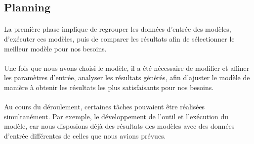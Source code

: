 \subsection{Planning}
\paragraph{}
\vspace{-2em}
La première phase implique de regrouper les données d'entrée des modèles, d'exécuter ces modèles, puis de comparer les résultats afin de sélectionner le meilleur modèle pour nos besoins.
\paragraph{}
\vspace{-2em}
Une fois que nous avons choisi le modèle, il a été nécessaire de modifier et affiner les paramètres d'entrée, analyser les résultats générés, afin d'ajuster le modèle de manière à obtenir les résultats les plus satisfaisants pour nos besoins.

\paragraph{}
\vspace{-2em}
Au cours du déroulement, certaines tâches pouvaient être réalisées simultanément. Par exemple, le développement de l'outil et l'exécution du modèle, car nous disposions déjà des résultats des modèles avec des données d'entrée différentes de celles que nous avions prévues. 

